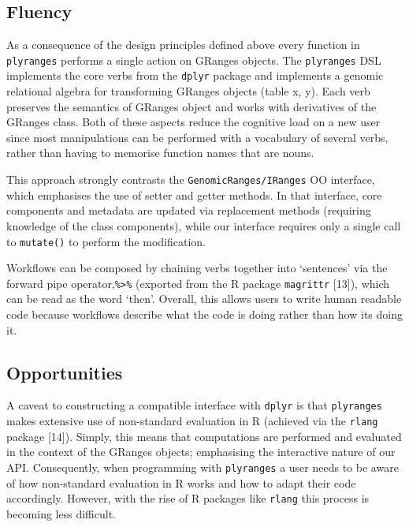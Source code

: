 \documentclass[10pt,letterpaper]{article}
\begin{document}
\subsection{Fluency}\label{fluency}

As a consequence of the design principles defined above every function
in \texttt{plyranges} performs a single action on GRanges objects. The
\texttt{plyranges} DSL implements the core verbs from the \texttt{dplyr}
package and implements a genomic relational algebra for transforming
GRanges objects (table x, y). Each verb preserves the semantics of
GRanges object and works with derivatives of the GRanges class. Both of
these aspects reduce the cognitive load on a new user since most
manipulations can be performed with a vocabulary of several verbs,
rather than having to memorise function names that are nouns.

This approach strongly contrasts the \texttt{GenomicRanges/IRanges} OO
interface, which emphasises the use of setter and getter methods. In
that interface, core components and metadata are updated via replacement
methods (requiring knowledge of the class components), while our
interface requires only a single call to \texttt{mutate()} to perform
the modification.

Workflows can be composed by chaining verbs together into `sentences'
via the forward pipe operator,\texttt{\%\textgreater{}\%} (exported from
the R package \texttt{magrittr} {[}13{]}), which can be read as the word
`then'. Overall, this allows users to write human readable code because
workflows describe what the code is doing rather than how its doing it.

\subsection{Opportunities}\label{opportunities}

A caveat to constructing a compatible interface with \texttt{dplyr} is
that \texttt{plyranges} makes extensive use of non-standard evaluation
in R (achieved via the \texttt{rlang} package {[}14{]}). Simply, this
means that computations are performed and evaluated in the context of
the GRanges objects; emphasising the interactive nature of our API.
Consequently, when programming with \texttt{plyranges} a user needs to
be aware of how non-standard evaluation in R works and how to adapt
their code accordingly. However, with the rise of R packages like
\texttt{rlang} this process is becoming less difficult.
\end{document}
